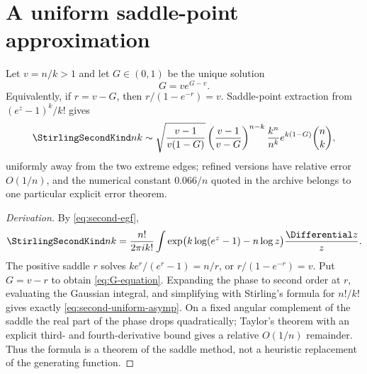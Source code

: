 \documentclass[11pt,a4paper,oneside,openany]{book}
\theoremstyle{definition}
\theoremstyle{remark}
\begin{document}
\section{A uniform saddle-point approximation}
Let $v=n/k>1$ and let $G\in(0,1)$ be the unique solution
\begin{equation}\label{eq:G-equation}
 G=ve^{G-v}.
\end{equation}
Equivalently, if $r=v-G$, then $r/(1-e^{-r})=v$.
Saddle-point extraction from $(e^z-1)^k/k!$ gives
\begin{equation}\label{eq:second-uniform-asymp}
 \StirlingSecondKind nk
 \sim
 \sqrt{\frac{v-1}{v(1-G)}}
 \left(\frac{v-1}{v-G}\right)^{n-k}
 \frac{k^n}{n^k}e^{k(1-G)}\binom nk,
\end{equation}
uniformly away from the two extreme edges; refined versions have relative error
$O(1/n)$, and the numerical constant $0.066/n$ quoted in the archive belongs to one
particular explicit error theorem.

\begin{proof}[Derivation]
By \cref{eq:second-egf},
\[
 \StirlingSecondKind nk=\frac{n!}{2\pi i k!}\int
 \exp\bigl(k\log(e^z-1)-n\log z\bigr)\frac{\Differential z}{z}.
\]
The positive saddle $r$ solves
$ke^r/(e^r-1)=n/r$, or $r/(1-e^{-r})=v$.  Put $G=v-r$ to obtain
\cref{eq:G-equation}.  Expanding the phase to second order at $r$, evaluating the
Gaussian integral, and simplifying with Stirling's formula for $n!/k!$ gives exactly
\cref{eq:second-uniform-asymp}.  On a fixed angular complement of the saddle the
real part of the phase drops quadratically; Taylor's theorem with an explicit third-
and fourth-derivative bound gives a relative $O(1/n)$ remainder.  Thus the formula is
a theorem of the saddle method, not a heuristic replacement of the generating
function.
\end{proof}
\end{document}
